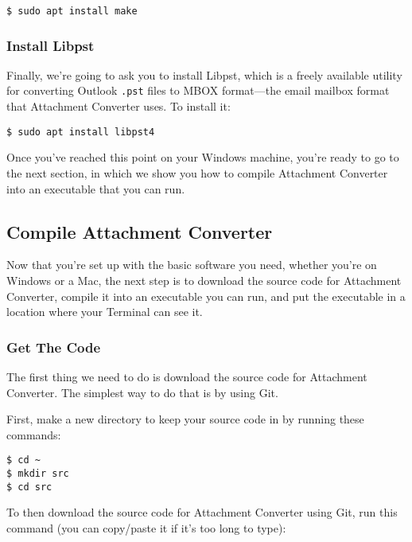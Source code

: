 \documentclass[11pt]{article}
\begin{document}
\begin{verbatim}
$ sudo apt install make
\end{verbatim}

\subsubsection{Install Libpst}
\label{sec:orga9d1663}

Finally, we're going to ask you to install Libpst, which is a freely
available utility for converting Outlook \texttt{.pst} files to MBOX
format---the email mailbox format that Attachment Converter uses.  To
install it:

\begin{verbatim}
$ sudo apt install libpst4
\end{verbatim}

Once you've reached this point on your Windows machine, you're ready
to go to the next section, in which we show you how to compile
Attachment Converter into an executable that you can run.

\subsection{Compile Attachment Converter \label{org7b01fff}}
\label{sec:org1d1b548}

Now that you're set up with the basic software you need, whether
you're on Windows or a Mac, the next step is to download the source
code for Attachment Converter, compile it into an executable you can
run, and put the executable in a location where your Terminal can see
it.

\subsubsection{Get The Code}
\label{sec:orgfc70e1a}

The first thing we need to do is download the source code for
Attachment Converter.  The simplest way to do that is by using Git.

First, make a new directory to keep your source code in by running
these commands:

\begin{verbatim}
$ cd ~
$ mkdir src
$ cd src
\end{verbatim}

To then download the source code for Attachment Converter using Git,
run this command (you can copy/paste it if it's too long to type):
\end{document}
